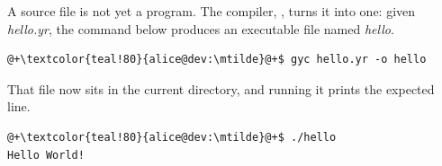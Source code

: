 A source file is not yet a program. The compiler, , turns it into one:
given \textit{hello.yr}, the command below produces an executable file named
\textit{hello}.

\begin{lstlisting}[style=bashVerb, escapechar=@+]
@+\textcolor{teal!80}{alice@dev:\mtilde}@+$ gyc hello.yr -o hello
\end{lstlisting}

That file now sits in the current directory, and running it prints the expected
line.

\begin{lstlisting}[style=bashVerb, escapechar=@+]
@+\textcolor{teal!80}{alice@dev:\mtilde}@+$ ./hello
Hello World!
\end{lstlisting}


\vfill
\pagebreak

